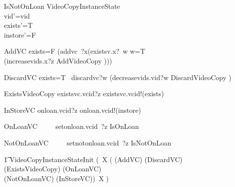 \documentclass{article}
\begin{document}
\begin{schema}{IsNotOnLoan}
   \Delta VideoCopyInstanceState \\
    \where
    vid'=vid\\
    exists'=T\\
    instore'=F\\
\end{schema}

\begin{circusaction}
     AddVC \circdef \lcircguard exists=F \rcircguard  \circguard
     				(addvc~?x\then (existsv.x?~w \then \lcircguard w=T \rcircguard \circguard \\
						 (increasevids.x?z \then \lschexpract AddVideoCopy \rschexpract)))  \\
\end{circusaction}

\begin{circusaction}
     DiscardVC \circdef \lcircguard exists=T \rcircguard  \circguard\ discardvc?w \then (decreasevids.vid?w \then  \lschexpract DiscardVideoCopy \rschexpract) \\
\end{circusaction}

\begin{circusaction}
     ExistsVideoCopy \circdef existsvc.vcid?z \then existsvc.vcid!(exists) \then \Skip \\
\end{circusaction}

\begin{circusaction}
     InStoreVC \circdef onloan.vcid?z \then onloan.vcid!(instore) \then \Skip \\
\end{circusaction}

\begin{circusaction}
     OnLoanVC ~~\circdef~~ setonloan.vcid~?z \then \lschexpract IsOnLoan \rschexpract  \\
\end{circusaction}

\begin{circusaction}
     NotOnLoanVC ~~\circdef~~ setnotonloan.vcid~?z \then \lschexpract IsNotOnLoan \rschexpract  \\
\end{circusaction}

\begin{circusaction}
   \t1 \circspot \lschexpract  VideoCopyInstanceStateInit \rschexpract\circseq  (\circmu\ X \circspot (
   					(AddVC)
					\extchoice
					(DiscardVC)\\
					\extchoice
					(ExistsVideoCopy)
					\extchoice
					(OnLoanVC)\\
					\extchoice
					(NotOnLoanVC)
					\extchoice
					(InStoreVC))\
					\circseq X )
\end{circusaction}
\end{document}
